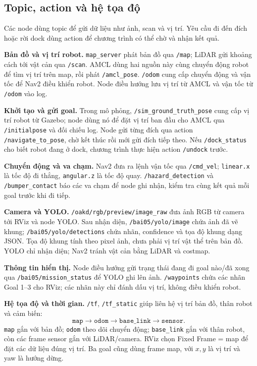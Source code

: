 \documentclass[a4paper,11pt]{article}
\newcommand{\code}[1]{\nolinkurl{#1}}
\begin{document}
\subsection{Topic, action và hệ tọa độ}
Các node dùng topic để gửi dữ liệu như ảnh, scan và vị trí. Yêu cầu đi đến đích
hoặc rời dock dùng action để chương trình có thể chờ và nhận kết quả.

\textbf{Bản đồ và vị trí robot.}
\code{map_server} phát bản đồ qua \code{/map}; LiDAR gửi khoảng cách tới vật cản
qua \code{/scan}. AMCL dùng hai nguồn này cùng chuyển động robot để tìm vị trí
trên map, rồi phát \code{/amcl_pose}. \code{/odom} cung cấp chuyển động và vận tốc
để Nav2 điều khiển robot. Node điều hướng lưu vị trí từ AMCL và vận tốc từ
\code{/odom} vào log.

\textbf{Khởi tạo và gửi goal.}
Trong mô phỏng, \code{/sim_ground_truth_pose} cung cấp vị trí robot từ Gazebo;
node dùng nó để đặt vị trí ban đầu cho AMCL qua \code{/initialpose} và đối chiếu log.
Node gửi từng đích qua action \code{/navigate_to_pose}, chờ kết thúc rồi mới gửi
đích tiếp theo. Nếu \code{/dock_status} cho biết robot đang ở dock, chương trình
thực hiện action \code{/undock} trước.

\textbf{Chuyển động và va chạm.}
Nav2 đưa ra lệnh vận tốc qua \code{/cmd_vel}; \code{linear.x} là tốc độ đi thẳng,
\code{angular.z} là tốc độ quay. \code{/hazard_detection} và \code{/bumper_contact}
báo các va chạm để node ghi nhận, kiểm tra cùng kết quả mỗi goal trước khi đi tiếp.

\textbf{Camera và YOLO.}
\code{/oakd/rgb/preview/image_raw} đưa ảnh RGB từ camera tới RViz và node YOLO.
Sau nhận diện, \code{/bai05/yolo/image} chứa ảnh đã vẽ khung;
\code{/bai05/yolo/detections} chứa nhãn, confidence và tọa độ khung dạng JSON.
Tọa độ khung tính theo pixel ảnh, chưa phải vị trí vật thể trên bản đồ.
YOLO chỉ nhận diện; Nav2 tránh vật cản bằng LiDAR và costmap.

\textbf{Thông tin hiển thị.}
Node điều hướng gửi trạng thái đang đi goal nào/đã xong qua
\code{/bai05/mission_status} để YOLO ghi lên ảnh. \code{/waypoints} chứa các nhãn
Goal 1--3 cho RViz; các nhãn này chỉ đánh dấu vị trí, không điều khiển robot.

\textbf{Hệ tọa độ và thời gian.}
\code{/tf}, \code{/tf_static} giúp liên hệ vị trí bản đồ, thân robot và cảm biến:
\[
\texttt{map}\longrightarrow\texttt{odom}\longrightarrow
\texttt{base\_link}\longrightarrow\texttt{sensor}.
\]
\code{map} gắn với bản đồ; \code{odom} theo dõi chuyển động;
\code{base_link} gắn với thân robot, còn các frame sensor gắn với LiDAR/camera.
RViz chọn Fixed Frame = map để đặt các dữ liệu đúng vị trí. Ba goal cũng dùng
frame map, với \(x,y\) là vị trí và yaw là hướng dừng.
\end{document}

